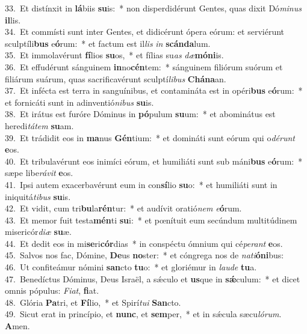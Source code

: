 {33.~}Et distínxit in \textbf{lá}biis \textbf{su}is:~* non disperdidérunt Gentes, quas dixit Dó\textit{mi}\textit{nus} \textbf{il}lis.\\
{34.~}Et commísti sunt inter Gentes, et didicérunt ópera eórum: et serviérunt sculptíli\textbf{bus} e\textbf{ó}rum:~* et factum est il\textit{lis} \textit{in} \textbf{scán}\textbf{da}lum.\\
{35.~}Et immolavérunt \textbf{fí}lios \textbf{su}os,~* et fílias su\textit{as} \textit{dæ}\textbf{mó}\textbf{ni}is.\\
{36.~}Et effudérunt sánguinem \textbf{in}no\textbf{cén}tem:~* sánguinem filiórum suórum et filiárum suárum, quas sacrificavérunt sculptí\textit{li}\textit{bus} \textbf{Chá}\textbf{na}an.\\
{37.~}Et infécta est terra in sanguínibus, et contamináta est in opéri\textbf{bus} e\textbf{ó}rum:~* et fornicáti sunt in adinventió\textit{ni}\textit{bus} \textbf{su}is.\\
{38.~}Et irátus est furóre Dóminus in \textbf{pó}pulum \textbf{su}um:~* et abominátus est heredi\textit{tá}\textit{tem} \textbf{su}am.\\
{39.~}Et trádidit eos in \textbf{ma}nus \textbf{Gén}tium:~* et domináti sunt eórum qui o\textit{dé}\textit{runt} \textbf{e}os.\\
{40.~}Et tribulavérunt eos inimíci eórum, et humiliáti sunt sub máni\textbf{bus} e\textbf{ó}rum:~* sæpe libe\textit{rá}\textit{vit} \textbf{e}os.\\
{41.~}Ipsi autem exacerbavérunt eum in con\textbf{sí}lio \textbf{su}o:~* et humiliáti sunt in iniquitá\textit{ti}\textit{bus} \textbf{su}is.\\
{42.~}Et vidit, cum tri\textbf{bu}la\textbf{rén}tur:~* et audívit oratió\textit{nem} \textit{e}\textbf{ó}rum.\\
{43.~}Et memor fuit testa\textbf{mén}ti \textbf{su}i:~* et pœnítuit eum secúndum multitúdinem misericór\textit{di}\textit{æ} \textbf{su}æ.\\
{44.~}Et dedit eos in mi\textbf{se}ri\textbf{cór}dias~* in conspéctu ómnium qui cé\textit{pe}\textit{rant} \textbf{e}os.\\
{45.~}Salvos nos fac, Dómine, \textbf{De}us \textbf{no}ster:~* et cóngrega nos de \textit{na}\textit{ti}\textbf{ó}\textbf{ni}bus:\\
{46.~}Ut confiteámur nómini \textbf{san}cto \textbf{tu}o:~* et gloriémur in \textit{lau}\textit{de} \textbf{tu}a.\\
{47.~}Benedíctus Dóminus, Deus Israël, a sǽculo et \textbf{us}que in \textbf{sǽ}culum:~* et dicet omnis pópulus: \textit{Fi}\textit{at}, \textbf{fi}at.\\
{48.~}Glória \textbf{Pa}tri, et \textbf{Fí}lio,~* et Spirí\textit{tu}\textit{i} \textbf{San}cto.\\
{49.~}Sicut erat in princípio, et \textbf{nunc}, et \textbf{sem}per,~* et in sǽcula sæcu\textit{ló}\textit{rum}. \textbf{A}men.\\
